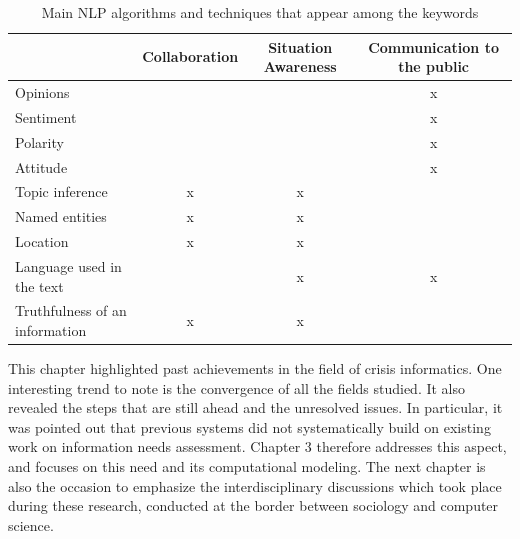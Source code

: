 \begin{table}
    \centering
    \caption{Main NLP algorithms and techniques that appear among the keywords}
    \label{table:lit-review-summary}
    \begin{tabular}{l|ccc}
                                       & Collaboration & Situation Awareness & Communication to the public \\
        \toprule
        Opinions                       &               &                     & x                           \\
        Sentiment                      &               &                     & x                           \\
        Polarity                       &               &                     & x                           \\
        Attitude                       &               &                     & x                           \\
        Topic inference                & x             & x                   &                             \\
        Named entities                 & x             & x                   &                             \\
        Location                       & x             & x                   &                             \\
        Language used in the text      &               & x                   & x                           \\
        Truthfulness of an information & x             & x                   &                             \\
        \bottomrule
    \end{tabular}
\end{table}

This chapter highlighted past achievements in the field of crisis informatics.
One interesting trend to note is the convergence of all the fields studied.
It also revealed the steps that are still ahead and the unresolved issues.
In particular, it was pointed out that previous systems did not systematically build on existing work on information needs assessment.
Chapter 3 therefore addresses this aspect, and focuses on this need and its computational modeling.
The next chapter is also the occasion to emphasize the interdisciplinary discussions which took place during these research, conducted at the border between sociology and computer science.

